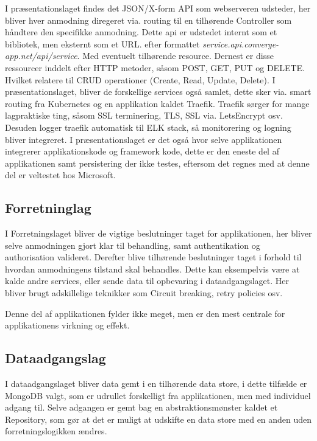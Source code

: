I præsentationslaget findes det JSON/X-form API som webserveren udsteder, her bliver hver anmodning diregeret via. routing til en tilhørende Controller som håndtere den specifikke anmodning. Dette api er udstedet internt som et bibliotek, men eksternt som et URL. efter formattet \textit{service.api.converge-app.net/api/service}. Med eventuelt tilhørende resource. Dernest er disse ressourcer inddelt efter HTTP metoder, såsom POST, GET, PUT og DELETE. Hvilket relatere til CRUD operationer (Create, Read, Update, Delete). I præsentationslaget, bliver de forskellige services også samlet, dette sker via. smart routing fra Kubernetes og en applikation kaldet Traefik. Traefik sørger for mange lagpraktiske ting, såsom SSL terminering, TLS, SSL via. LetsEncrypt osv. Desuden logger traefik automatisk til ELK stack, så monitorering og logning bliver integreret. I præsentationslaget er det også hvor selve applikationen integrerer applikationskode og framework kode, dette er den eneste del af applikationen samt persistering der ikke testes, eftersom det regnes med at denne del er veltestet hos Microsoft.

\subsection{Forretninglag}

I Forretningslaget bliver de vigtige beslutninger taget for applikationen, her bliver selve anmodningen gjort klar til behandling, samt authentikation og authorisation valideret. Derefter blive tilhørende beslutninger taget i forhold til hvordan anmodningens tilstand skal behandles. Dette kan eksempelvis være at kalde andre services, eller sende data til opbevaring i dataadgangslaget. Her bliver brugt adskillelige teknikker som Circuit breaking, retry policies osv.

Denne del af applikationen fylder ikke meget, men er den mest centrale for applikationens virkning og effekt.

\subsection{Dataadgangslag}

I dataadgangslaget bliver data gemt i en tilhørende data store, i dette tilfælde er MongoDB valgt, som er udrullet forskelligt fra applikationen, men med individuel adgang til. Selve adgangen er gemt bag en abstraktionsmønster kaldet et Repository, som gør at det er muligt at udskifte en data store med en anden uden forretningslogikken ændres.

